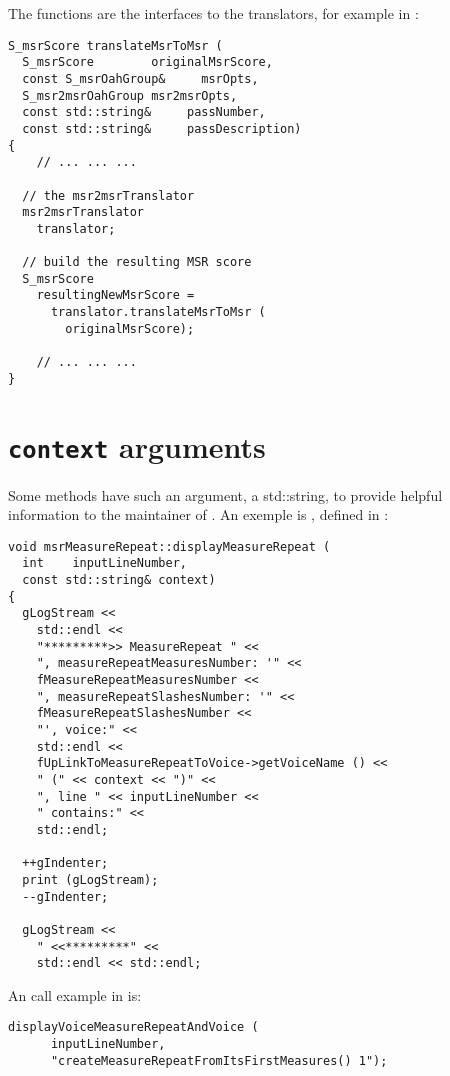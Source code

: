 The  functions are the interfaces to the translators, for example in :
\begin{lstlisting}[language=CPlusPlus]
S_msrScore translateMsrToMsr (
  S_msrScore        originalMsrScore,
  const S_msrOahGroup&     msrOpts,
  S_msr2msrOahGroup msr2msrOpts,
  const std::string&     passNumber,
  const std::string&     passDescription)
{
	// ... ... ...

  // the msr2msrTranslator
  msr2msrTranslator
    translator;

  // build the resulting MSR score
  S_msrScore
    resultingNewMsrScore =
      translator.translateMsrToMsr (
        originalMsrScore);

	// ... ... ...
}
\end{lstlisting}


\section{{\tt context} arguments}

Some methods have such an argument, a std::string, to provide helpful information to the maintainer of \mf. An exemple is , defined in :
\begin{lstlisting}[language=CPlusPlus]
void msrMeasureRepeat::displayMeasureRepeat (
  int    inputLineNumber,
  const std::string& context)
{
  gLogStream <<
    std::endl <<
    "*********>> MeasureRepeat " <<
    ", measureRepeatMeasuresNumber: '" <<
    fMeasureRepeatMeasuresNumber <<
    ", measureRepeatSlashesNumber: '" <<
    fMeasureRepeatSlashesNumber <<
    "', voice:" <<
    std::endl <<
    fUpLinkToMeasureRepeatToVoice->getVoiceName () <<
    " (" << context << ")" <<
    ", line " << inputLineNumber <<
    " contains:" <<
    std::endl;

  ++gIndenter;
  print (gLogStream);
  --gIndenter;

  gLogStream <<
    " <<*********" <<
    std::endl << std::endl;
\end{lstlisting}

An call example in  is:
\begin{lstlisting}[language=CPlusPlus]
    displayVoiceMeasureRepeatAndVoice (
      inputLineNumber,
      "createMeasureRepeatFromItsFirstMeasures() 1");
\end{lstlisting}


